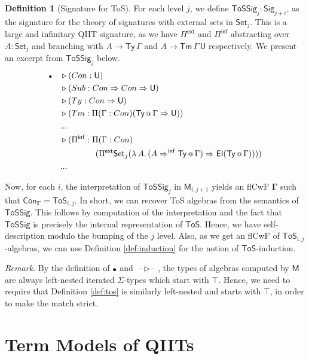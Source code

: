\documentclass{article}
\makeatletter
\theoremstyle{definition}
\newtheorem{definition}{Definition}
\theoremstyle{theorem}
\newcommand{\Con}{\mathsf{Con}}
\newcommand{\Tm}{\mathsf{Tm}}
\newcommand{\Ty}{\mathsf{Ty}}
\newcommand{\U}{\mathsf{U}}
\newcommand{\El}{\mathsf{El}}
\newcommand{\blank}{\mathord{\hspace{1pt}\text{--}\hspace{1pt}}}
\newcommand{\ra}{\rightarrow}
\newcommand{\Set}{\mathsf{Set}}
\newcommand{\ToS}{\mathsf{ToS}}
\newcommand{\ext}{\triangleright}
\newcommand{\emptycon}{\scaleobj{.75}\bullet}
\newcommand{\Pii}{\Pi}
\newcommand{\Pie}{\Pi^{\mathsf{ext}}}
\newcommand{\Piinf}{\Pi^{\mathsf{inf}}}
\newcommand{\appitt}{\mathop{{\scriptstyle @}}}
\newcommand{\Sig}{\mathsf{Sig}}
\newcommand{\ToSSig}{\mathsf{ToSSig}}
\newcommand{\arri}{\Rightarrow}
\newcommand{\arrinf}{\Rightarrow^{\mathsf{inf}}}
\newcommand{\bGamma}{\boldsymbol{\Gamma}}
\newcommand{\bemptycon}{\boldsymbol{\emptycon}}
\newcommand{\bM}{\boldsymbol{\mathsf{M}}}
\makeatother
\begin{document}
\begin{definition}[Signature for ToS] For each level $j$,
we define $\ToSSig_j : \Sig_{j+i}$, as the signature for the theory of
signatures with external sets in $\Set_j$. This is a large and infinitary QIIT
signature, as we have $\Pie$ and $\Piinf$ abstracting over $A : \Set_j$ and
branching with $A \ra \Ty\,\Gamma$ and $A \ra \Tm\,\Gamma\,\U$ respectively. We
present an excerpt from $\ToSSig_j$ below.
\begin{alignat*}{3}
  & \emptycon && \ext (Con : \U)\\
  &           && \ext (Sub : Con\arri Con \arri \U)\\
  &           && \ext (Ty  : Con\arri\U)\\
  &           && \ext (Tm  : \Pii(\Gamma : Con)(\Ty\appitt\Gamma \arri \U))\\
  &           && ...\\
  &           && \ext (\Piinf : \Pii(\Gamma : Con)\\
  &           && \hspace{4.2em}(\Pie \Set_j (\lambda\,A.\,(A \arrinf \Ty\appitt\Gamma)\arri\El(\Ty\appitt\Gamma))))\\
  &           && ...
\end{alignat*}
\end{definition}

Now, for each $i$, the interpretation of $\ToSSig_j$ in $\bM_{i,j+1}$ yields an
flCwF $\bGamma$ such that $\Con_{\bGamma} = \ToS_{i,j}$. In short, we can
recover ToS algebras from the semantics of $\ToSSig$. This follows by
computation of the interpretation and the fact that $\ToSSig$ is precisely the
internal representation of $\ToS$. Hence, we have self-description modulo the
bumping of the $j$ level. Also, as we get an flCwF of $\ToS_{i,j}$-algebras, we
can use Definition \ref{def:induction} for the notion of $\ToS$-induction.

\emph{Remark.} By the definition of $\bemptycon$ and
$\boldsymbol{\blank\ext\blank}$, the types of algebras computed by $\bM$ are
always left-nested iterated $\Sigma$-types which start with $\top$. Hence, we
need to require that Definition \ref{def:tos} is similarly left-nested and
starts with $\top$, in order to make the match strict.

\section{Term Models of QIITs}
\label{sec:termmodels}
\end{document}
